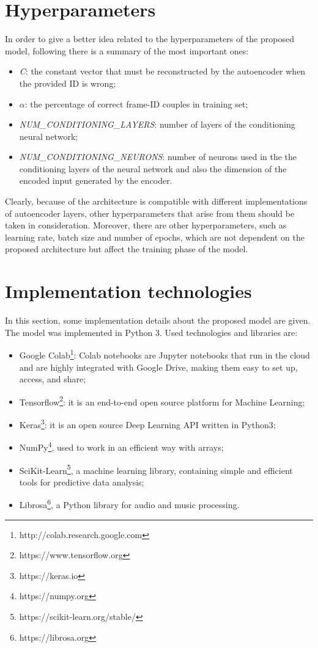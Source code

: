 \section{Hyperparameters}
In order to give a better idea related to the hyperparameters of the proposed model, following there is a summary of the most important ones:
\begin{itemize}
    \item {\textit{C}: the constant vector that must be reconstructed by the autoencoder when the provided ID is wrong;}
    \item {$\alpha$: the percentage of correct frame-ID couples in training set;}
    \item {\textit{NUM\_CONDITIONING\_LAYERS}: number of layers of the conditioning neural network;}
    \item {\textit{NUM\_CONDITIONING\_NEURONS}: number of neurons used in the the conditioning layers of the neural network and also the dimension of the encoded input generated by the encoder.}
\end{itemize}
Clearly, because of the architecture is compatible with different implementations of autoencoder layers, other hyperparameters that arise from them should be taken in consideration. Moreover, there are other hyperparameters, such as learning rate, batch size and number of epochs, which are not dependent on the proposed architecture but affect the training phase of the model.
\section{Implementation technologies}
In this section, some implementation details about the proposed model are given. The model was implemented in Python 3. Used technologies and libraries are:
\begin{itemize}
    \item {Google Colab\footnote{http://colab.research.google.com}: Colab notebooks are Jupyter notebooks that run in the cloud and are highly integrated with Google Drive, making them easy to set up, access, and share;}
    \item {Tensorflow\footnote{https://www.tensorflow.org}: it is an end-to-end open source platform for Machine Learning;}
    \item {Keras\footnote{https://keras.io}: it is an open source Deep Learning API written in Python3;}
    \item {NumPy\footnote{https://numpy.org}, used to work in an efficient way with arrays;}
    \item {SciKit-Learn\footnote{https://scikit-learn.org/stable/}, a machine learning library, containing simple and efficient tools for predictive data analysis;}
    \item {Librosa\footnote{https://librosa.org}, a Python library for audio and music processing.}
\end{itemize}

